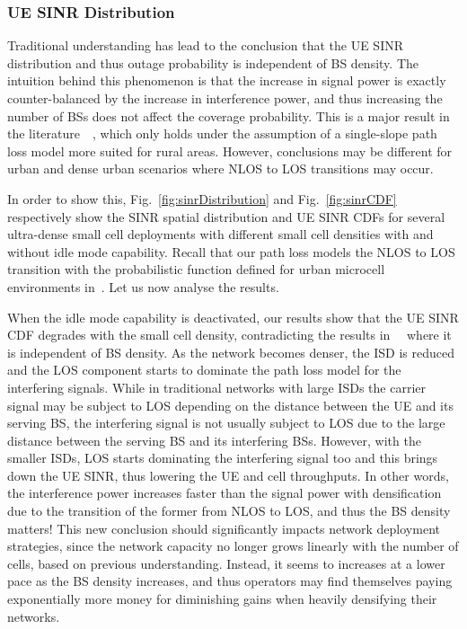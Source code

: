 \documentclass{IEEEtran}
\begin{document}
\subsubsection{\ac{UE} \ac{SINR} Distribution}

Traditional understanding has lead to the conclusion that the \ac{UE} \ac{SINR} distribution and thus outage probability is independent of \ac{BS} density.
The intuition behind this phenomenon is that the increase in signal power is exactly counter-balanced by the increase in interference power,
and thus increasing the number of BSs does not affect the coverage probability.
This is  a major result in the literature~\cite{Andrews2011}~\cite{Mukherjee2012},
which only holds under the assumption of a single-slope path loss model more suited for rural areas.
However, conclusions may be different for urban and dense urban scenarios where \ac{NLOS} to \ac{LOS} transitions may occur.

In order to show this,
Fig.~\ref{fig:sinrDistribution} and Fig.~\ref{fig:sinrCDF} respectively show the \ac{SINR} spatial distribution and \ac{UE} \ac{SINR} \acp{CDF}
for several ultra-dense small cell deployments
with different small cell densities with and without idle mode capability.
Recall  that our path loss models the \ac{NLOS} to \ac{LOS} transition with the probabilistic function defined for urban microcell environments in~\cite{TR36.814}.
Let us now analyse the results.

When the idle mode capability is deactivated,
our results show that the \ac{UE} \ac{SINR} \ac{CDF} degrades with the small cell density,
contradicting the results in~\cite{Andrews2011}~\cite{Mukherjee2012} where it is independent of \ac{BS} density.
As the network becomes denser,
the \ac{ISD} is reduced and the \ac{LOS} component starts to dominate the path loss model for the interfering signals.
While in traditional networks with large \acp{ISD} the carrier signal may be subject to \ac{LOS} depending on the distance between the \ac{UE} and its serving \ac{BS},
the interfering signal is not usually subject to \ac{LOS} due to the large distance between the serving \ac{BS} and its interfering \acp{BS}.
However, with the smaller \acp{ISD},
\ac{LOS} starts dominating the interfering signal too and this brings down the \ac{UE} \ac{SINR},
thus lowering the \ac{UE} and cell throughputs.
In other words, the interference power increases faster than the signal power with densification due to the transition of the former from \ac{NLOS} to \ac{LOS},
and thus the BS density matters!
This new conclusion should significantly impacts network deployment strategies,
since the network capacity no longer grows linearly with the number of cells, based on previous understanding.
Instead, it seems to increases at a lower pace as the BS density increases,
and thus operators may find themselves paying exponentially more money for diminishing gains when heavily densifying their networks.
\end{document}

